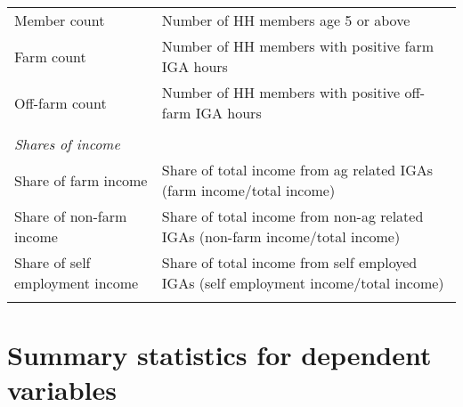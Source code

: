 \documentclass[a4paper,11pt]{article}
\begin{document}
\begin{table}[H]
{\begin{tabular}{ll}
  
  Member count & Number of HH members age 5 or above \\

Farm count   & Number of HH members with positive farm IGA hours\\

Off-farm count   & Number of HH members with positive off-farm IGA hours\\

& \\
  \textit{Shares of income} &   \\
  
    Share of farm income   & Share of total income from ag related IGAs (farm income/total income) \\

   
  Share of non-farm income   &  Share of total income from non-ag related IGAs (non-farm income/total income)\\
      
 Share of self employment income  &  Share of total income from self employed IGAs (self employment income/total income)\\

\hline \\[-1.8ex] 
\end{tabular}} 
\end{table}


\newpage

\section{Summary statistics for dependent variables}
\end{document}
